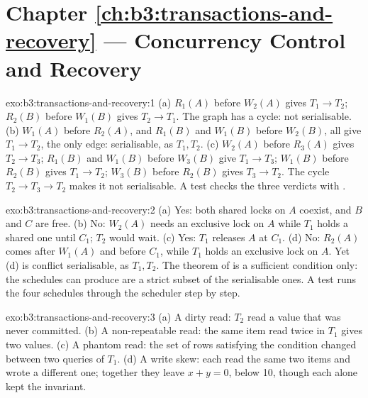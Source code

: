 \section*{Chapter \ref{ch:b3:transactions-and-recovery} --- Concurrency Control and Recovery}

\begin{solution}{exo:b3:transactions-and-recovery:1}
(a) $R_1(A)$ before $W_2(A)$ gives $T_1 \to T_2$; $R_2(B)$ before $W_1(B)$ gives $T_2 \to T_1$. The graph has a cycle: not serialisable. (b) $W_1(A)$ before $R_2(A)$, and $R_1(B)$ and $W_1(B)$ before $W_2(B)$, all give $T_1 \to T_2$, the only edge: serialisable, as $T_1, T_2$. (c) $W_2(A)$ before $R_3(A)$ gives $T_2 \to T_3$; $R_1(B)$ and $W_1(B)$ before $W_3(B)$ give $T_1 \to T_3$; $W_1(B)$ before $R_2(B)$ gives $T_1 \to T_2$; $W_3(B)$ before $R_2(B)$ gives $T_3 \to T_2$. The cycle $T_2 \to T_3 \to T_2$ makes it not serialisable. A test checks the three verdicts with .
\end{solution}

\begin{solution}{exo:b3:transactions-and-recovery:2}
(a) Yes: both shared locks on $A$ coexist, and $B$ and $C$ are free. (b) No: $W_2(A)$ needs an exclusive lock on $A$ while $T_1$ holds a shared one until $C_1$; $T_2$ would wait. (c) Yes: $T_1$ releases $A$ at $C_1$. (d) No: $R_2(A)$ comes after $W_1(A)$ and before $C_1$, while $T_1$ holds an exclusive lock on $A$. Yet (d) is conflict serialisable, as $T_1, T_2$. The theorem of  is a sufficient condition only: the schedules  can produce are a strict subset of the serialisable ones. A test runs the four schedules through the scheduler step by step.
\end{solution}

\begin{solution}{exo:b3:transactions-and-recovery:3}
(a) A dirty read: $T_2$ read a value that was never committed. (b) A non-repeatable read: the same item read twice in $T_1$ gives two values. (c) A phantom read: the set of rows satisfying the condition changed between two queries of $T_1$. (d) A write skew: each read the same two items and wrote a different one; together they leave $x + y = 0$, below 10, though each alone kept the invariant.
\end{solution}

